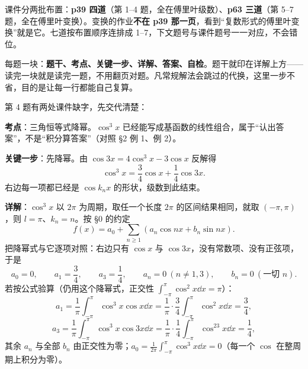 \documentclass[11pt]{ctexart}
\begin{document}

\flowerrule


课件分两批布置：\textbf{p39 四道}（第 1--4 题，全在傅里叶级数）、\textbf{p63 三道}（第 5--7 题，全在傅里叶变换）。变换的作业\textbf{不在 p39 那一页}，看到“复数形式的傅里叶变换”就是它。七道按布置顺序连排成 1--7，下文题号与课件题号一一对应，不会错位。

每题一块：\textbf{题干、考点、关键一步、详解、答案、自检}。题干就印在详解上方——读完一块就是读完一题，不用翻页对题。凡常规解法会跳过的代换，这里一步不省，目的是让每一行都能自己复算。

第 4 题有两处课件缺字，先交代清楚：

\qbreak



\textbf{考点}：三角恒等式降幂。$\cos^3x$ 已经能写成基函数的线性组合，属于“认出答案”，不是“积分算答案”（对照 §2 例 1、例 2）。

\textbf{关键一步}：先降幂。由 $\cos3x=4\cos^3x-3\cos x$ 反解得
\[ \cos^3x=\frac34\cos x+\frac14\cos3x .\]
右边每一项都已经是 $\cos k_nx$ 的形状，级数到此结束。

\textbf{详解}：$\cos^3x$ 以 $2\pi$ 为周期，取任一个长度 $2\pi$ 的区间结果相同，就取 $(-\pi,\pi)$，则 $l=\pi$、$k_n=n$。按 §0 的约定
\[ f(x)=a_0+\sum_{n\ge1}\left(a_n\cos nx+b_n\sin nx\right).\]
把降幂式与它逐项对照：右边只有 $\cos x$ 与 $\cos3x$，没有常数项、没有正弦项，于是
\[ a_0=0,\qquad a_1=\frac34,\qquad a_3=\frac14,\qquad a_n=0\ (n\neq1,3),\qquad b_n=0\ (\text{一切 }n).\]
若按公式验算（仍用这个降幂式，正交性 $\int_{-\pi}^{\pi}\cos^2x\dd x=\pi$）：
\[
a_1=\frac1\pi\int_{-\pi}^{\pi}\cos^3x\cos x\dd x=\frac1\pi\cdot\frac34\int_{-\pi}^{\pi}\cos^2x\dd x=\frac34,
\]
\[
a_3=\frac1\pi\int_{-\pi}^{\pi}\cos^3x\cos3x\dd x=\frac1\pi\cdot\frac14\int_{-\pi}^{\pi}\cos^23x\dd x=\frac14,
\]
其余 $a_n$ 与全部 $b_n$ 由正交性为零；$a_0=\frac{1}{2\pi}\int_{-\pi}^{\pi}\cos^3x\dd x=0$（每一个 $\cos$ 在整周期上积分为零）。
\end{document}
